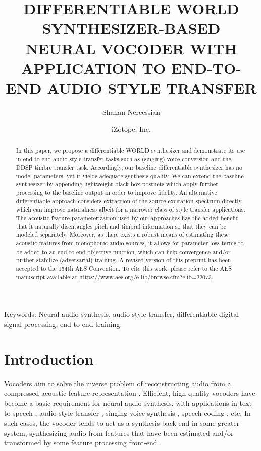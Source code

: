 \documentclass{article}
\title{DIFFERENTIABLE WORLD SYNTHESIZER-BASED \\ NEURAL VOCODER WITH APPLICATION TO END-TO-END AUDIO STYLE TRANSFER}
\author{Shahan Nercessian}
\date{iZotope, Inc.}
\begin{document}
\maketitle

\begin{sloppy}
\begin{abstract}
In this paper, we propose a differentiable WORLD synthesizer and demonstrate its use in end-to-end audio style transfer tasks such as (singing) voice conversion and the DDSP timbre transfer task.  Accordingly, our baseline differentiable synthesizer has no model parameters, yet it yields adequate synthesis quality.  We can extend the baseline synthesizer by appending lightweight black-box postnets which apply further processing to the baseline output in order to improve fidelity.  An alternative differentiable approach considers extraction of the source excitation spectrum directly, which can improve naturalness albeit for a narrower class of style transfer applications.  The acoustic feature parameterization used by our approaches has the added benefit that it naturally disentangles pitch and timbral information so that they can be modeled separately.  Moreover, as there exists a robust means of estimating these acoustic features from monophonic audio sources, it allows for parameter loss terms to be added to an end-to-end objective function, which can help convergence and/or further stabilize (adversarial) training.
A revised version of this preprint has been accepted to the 154th AES Convention.  To cite this work, please refer to the AES manuscript available at \href{https://www.aes.org/e-lib/browse.cfm?elib=22073}{https://www.aes.org/e-lib/browse.cfm?elib=22073}.
\end{abstract}
Keywords: Neural audio synthesis, audio style transfer, differentiable digital signal processing, end-to-end training.

\section{Introduction}
\label{sec:intro}
Vocoders aim to solve the inverse problem of reconstructing audio from a compressed acoustic feature representation \cite{Tacotron}.  Efficient, high-quality vocoders have become a basic requirement for neural audio synthesis, with applications in text-to-speech \cite{Tacotron}, audio style transfer \cite{Ddsp}, singing voice synthesis \cite{SingingSynthesis}, speech coding \cite{LPCNet}, etc.  In such cases, the vocoder tends to act as a synthesis back-end in some greater system, synthesizing audio from features that have been estimated and/or transformed by some feature processing front-end \cite{Tacotron}.


\end{sloppy}
\end{document}
